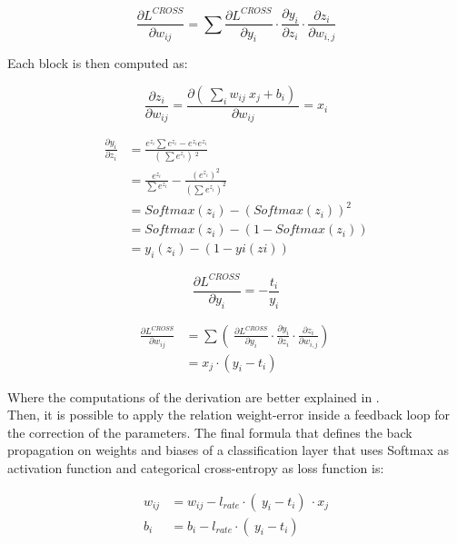 \documentclass[12pt]{report}
\begin{document}
\begin{equation}
	\frac{\partial L^{CROSS}}{\partial w_{ij}} = \sum  \frac{\partial L^{CROSS}}{\partial y_i} \cdot \frac{\partial y_i}{\partial z_i} \cdot \frac{\partial z_i}{\partial w_{i,j}   } 
\end{equation}

Each block is then computed as:

\begin{equation}
	\frac{\partial z_i}{\partial w_{ij}} = \frac{ \partial (\ \sum_i w_{ij} \: x_j + b_i )\ }{ \partial w_{ij}} = x_i 
\end{equation}

\begin{align}
	\frac{\partial y_i}{\partial z_i} &= \frac{e^{z_i} \sum e^{z_i} - e^{z_i} e^{z_i}}{ (\ \sum e^{z_i} )\ ^2} \nonumber \\
	&= \frac{e^{z_i}}{\sum e^{z_i}}- \frac{(e^{z_i})^2}{(\sum e^{z_i})^2} \nonumber \\
	&= Softmax(z_i) - (Softmax(z_i))^2 \nonumber \\
	&= Softmax(z_i) - (1-Softmax(z_i)) \\
	& = y_i(z_i) - (1-yi(zi))
\end{align}

\begin{equation}
	\frac{\partial L^{CROSS}}{\partial y_i} = - \frac{t_i}{y_i} 
\end{equation}

\begin{align}
	\frac{\partial L^{CROSS}}{\partial w_{ij}} &= \sum (\ \frac{\partial L^{CROSS}}{\partial y_i} \cdot \frac{\partial y_i}{\partial z_i} \cdot \frac{\partial z_i}{\partial w_{i,j}} )\ \nonumber \\
	& = x_j \cdot (y_i-t_i)
\end{align}

Where the computations of the derivation are better explained in \cite{derivation_passages}.\\
Then, it is possible to apply the relation weight-error inside a feedback loop for the correction of the parameters. The final formula that defines the back propagation on weights and biases of a classification layer that uses Softmax as activation function and categorical cross-entropy as loss function is:

\begin{align}
	w_{ij} &= w_{ij} - l_{rate} \cdot (\ y_i-t_i )\ \cdot x_j \label{w_update} \\
	b_i    &= b_i    - l_{rate} \cdot (\ y_i-t_i )\ \label{b_update} 
\end{align}
\end{document}
